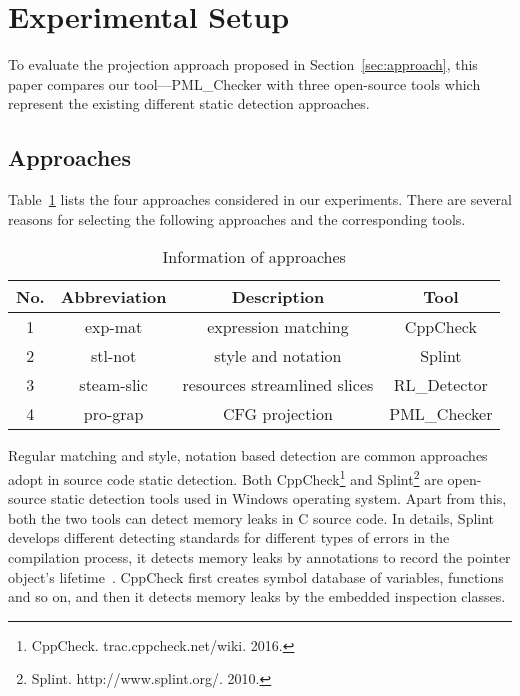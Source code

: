 \section{Experimental Setup}\label{sec:setup}
To evaluate the projection approach proposed in Section~\ref{sec:approach}, 
this paper compares our tool---PML\_Checker with three open-source tools which represent the existing different static detection approaches. 
\subsection{Approaches}\label{ssec:a}
Table~\ref{tab:1} lists the four approaches considered in our experiments. There are several reasons for selecting the following approaches and the corresponding tools. 
%
\begin{table}[!h]
\center
\caption{Information of approaches}\label{tab:1}
\begin{tabular}{|c|c|c|c|}
\hline
\textbf{No.} & \textbf{Abbreviation} & \textbf{Description} & \textbf{Tool}\\
\hline
1 & exp-mat & expression matching & CppCheck\\
\hline
2 & stl-not & style and notation &	Splint\\
\hline
3 & steam-slic & resources streamlined slices & RL\_Detector\\
\hline
4 & pro-grap &	CFG projection &	PML\_Checker\\
\hline
\end{tabular}
\end{table}
%
Regular matching and style, notation based detection are common approaches adopt in source code static detection. Both CppCheck\footnote{CppCheck. trac.cppcheck.net/wiki. 2016.} and Splint\footnote{Splint. http://www.splint.org/. 2010.} are open-source static detection tools used in Windows operating system. Apart from this, both the two tools can detect memory leaks in C source code. In details, Splint develops different detecting standards for different types of errors in the compilation process, it detects memory leaks by annotations to record the pointer object’s lifetime~\cite{EL02}. CppCheck first creates symbol database of variables, functions and so on, and then it detects memory leaks by the embedded inspection classes.
 
